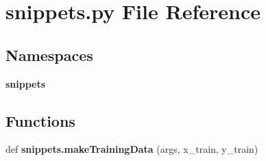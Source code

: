 \section{snippets.\+py File Reference}
\label{snippets_8py}
\subsection*{Namespaces}
\begin{DoxyCompactItemize}
\item 
 \textbf{ snippets}
\end{DoxyCompactItemize}
\subsection*{Functions}
\begin{DoxyCompactItemize}
\item 
def \textbf{ snippets.\+make\+Training\+Data} (args, x\+\_\+train, y\+\_\+train)
\end{DoxyCompactItemize}
